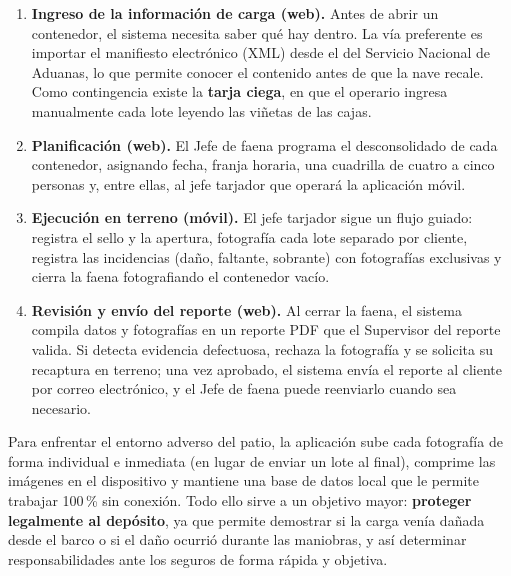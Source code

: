 \begin{enumerate}
    \item \textbf{Ingreso de la información de carga (web).} Antes de abrir un contenedor, el
          sistema necesita saber qué hay dentro. La vía preferente es importar el manifiesto
          electrónico (XML) desde el  del Servicio Nacional de Aduanas, lo que
          permite conocer el contenido antes de que la nave recale. Como contingencia existe la
          \textbf{tarja ciega}, en que el operario ingresa manualmente cada lote leyendo las
          viñetas de las cajas.
    \item \textbf{Planificación (web).} El Jefe de faena programa el desconsolidado de cada
          contenedor, asignando fecha, franja horaria, una cuadrilla de cuatro a cinco personas y,
          entre ellas, al jefe tarjador que operará la aplicación móvil.
    \item \textbf{Ejecución en terreno (móvil).} El jefe tarjador sigue un flujo guiado: registra
          el sello y la apertura, fotografía cada lote separado por cliente, registra las
          incidencias (daño, faltante, sobrante) con fotografías exclusivas y cierra la faena
          fotografiando el contenedor vacío.
    \item \textbf{Revisión y envío del reporte (web).} Al cerrar la faena, el sistema compila datos
          y fotografías en un reporte PDF que el Supervisor del reporte valida. Si detecta
          evidencia defectuosa, rechaza la fotografía y se solicita su recaptura en terreno; una vez
          aprobado, el sistema envía el reporte al cliente por correo electrónico, y el Jefe de
          faena puede reenviarlo cuando sea necesario.
\end{enumerate}

Para enfrentar el entorno adverso del patio, la aplicación sube cada fotografía de forma individual
e inmediata (en lugar de enviar un lote al final), comprime las imágenes en el dispositivo y
mantiene una base de datos local que le permite trabajar 100\,\% sin conexión. Todo ello sirve a
un objetivo mayor: \textbf{proteger legalmente al depósito}, ya que permite demostrar si la carga
venía dañada desde el barco o si el daño ocurrió durante las maniobras, y así determinar
responsabilidades ante los seguros de forma rápida y objetiva.
